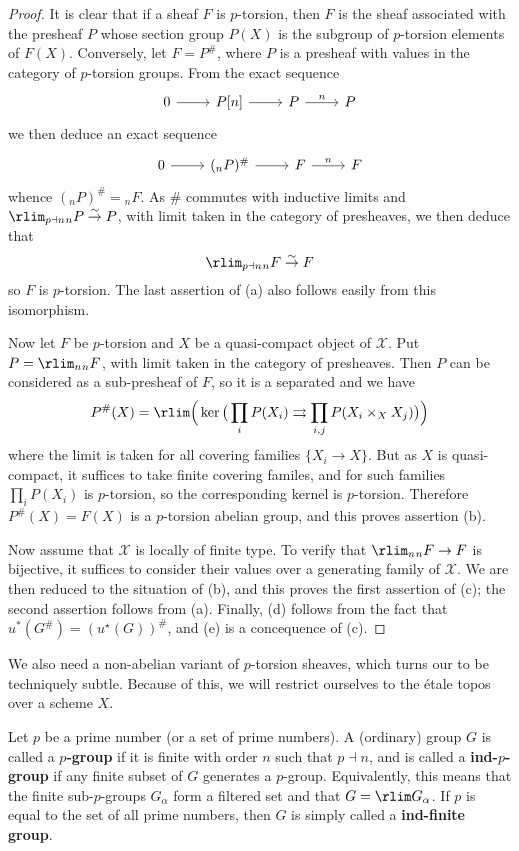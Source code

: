 \begin{proof}
It is clear that if a sheaf $F$ is $p$-torsion, then $F$ is the sheaf associated with the presheaf $P$ whose section group $P(X)$ is the subgroup of $p$-torsion elements of $F(X)$. Conversely, let $F=P^\#$, where $P$ is a presheaf with values in the category of $p$-torsion groups. From the exact sequence
\[\begin{tikzcd}
0\ar[r]&P[n]\ar[r]&P\ar[r,"n"]&P
\end{tikzcd}\]
we then deduce an exact sequence
\[\begin{tikzcd}
0\ar[r]&({_nP})^\#\ar[r]&F\ar[r,"n"]&F
\end{tikzcd}\]
whence $({_nP})^\#={_nF}$. As $\#$ commutes with inductive limits and $\rlim_{p\dashv n}{_nP}\stackrel{\sim}{\to}P$, with limit taken in the category of presheaves, we then deduce that
\[\rlim_{p\dashv n}{_nF}\stackrel{\sim}{\to} F\]
so $F$ is $p$-torsion. The last assertion of (a) also follows easily from this isomorphism.\par
Now let $F$ be $p$-torsion and $X$ be a quasi-compact object of $\mathcal{X}$. Put $P=\rlim_n{_nF}$, with limit taken in the category of presheaves. Then $P$ can be considered as a sub-presheaf of $F$, so it is a separated and we have
\[P^\#(X)=\rlim\Big(\ker\big(\prod_iP(X_i)\rightrightarrows \prod_{i,j}P(X_i\times_XX_j)\big)\Big)\]
where the limit is taken for all covering families $\{X_i\to X\}$. But as $X$ is quasi-compact, it suffices to take finite covering familes, and for such families $\prod_iP(X_i)$ is $p$-torsion, so the corresponding kernel is $p$-torsion. Therefore $P^\#(X)=F(X)$ is a $p$-torsion abelian group, and this proves assertion (b).\par
Now assume that $\mathcal{X}$ is locally of finite type. To verify that $\rlim_n{_nF}\to F$ is bijective, it suffices to consider their values over a generating family of $\mathcal{X}$. We are then reduced to the situation of (b), and this proves the first assertion of (c); the second assertion follows from (a). Finally, (d) follows from the fact that $u^*(G^\#)=(u^\star(G))^\#$, and (e) is a concequence of (c).
\end{proof}

We also need a non-abelian variant of $p$-torsion sheaves, which turns our to be techniquely subtle. Because of this, we will restrict ourselves to the \'etale topos over a scheme $X$.

\begin{definition}
Let $p$ be a prime number (or a set of prime numbers). A (ordinary) group $G$ is called a \textbf{$p$-group} if it is finite with order $n$ such that $p\dashv n$, and is called a \textbf{ind-$p$-group} if any finite subset of $G$ generates a $p$-group. Equivalently, this means that the finite sub-$p$-groups $G_\alpha$ form a filtered set and that $G=\rlim G_\alpha$. If $p$ is equal to the set of all prime numbers, then $G$ is simply called a \textbf{ind-finite group}.
\end{definition}


